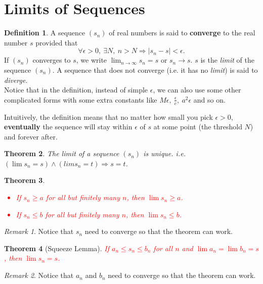 \documentclass[12pt, lettersize]{book}
\theoremstyle{plain}
\newtheorem{thm}{Theorem}[section]
\theoremstyle{definition}
\newtheorem{dfn}[thm]{Definition}
\theoremstyle{remark}
\newtheorem*{rem}{Remark}
\begin{document}
	\section{Limits of Sequences}		
	\begin{dfn}\label{def:limit}
		A sequence $(s_n)$ of real numbers is said to \textbf{converge} to the real number \emph{$s$} provided that
		\begin{displaymath}
			\forall \epsilon > 0,\ \exists N,\ n > N \Rightarrow |s_n-s| < \epsilon.
		\end{displaymath}
		If $(s_n)$ converges to $s$, we write $\lim_{n\rightarrow \infty}s_n=s$ or $s_n\rightarrow s$. $s$ is the \emph{limit} of the sequence $(s_n)$.
		A sequence that does not converge (i.e. it has no \emph{limit}) is said to \emph{diverge}.\\
		Notice that in the definition, instead of simple $\epsilon$, we can also use some other complicated forms with some extra constants like $M\epsilon,\ \frac{\epsilon}{c},\ a^2\epsilon$ and so on.
	\end{dfn}
	
	Intuitively, the definition means that no matter how small you pick $\epsilon>0$, \textbf{eventually} the sequence will stay within $\epsilon$ of $s$ at some point (the threshold $N$) and forever after.
	
	\begin{thm}
		The limit of a sequence $(s_n)$ is unique. i.e. $(\lim s_n=s) \land (lim s_n=t) \Rightarrow s=t$.
	\end{thm}
	
	\begin{thm}
		\textcolor{red}{
			\begin{itemize}
				\item If $s_n\geq a$ for all but finitely many $n$, then $\lim s_n\geq a$.
				\item If $s_n\leq b$ for all but finitely many $n$, then $\lim s_n\leq b$.
		\end{itemize}}
	\end{thm}
	\begin{rem}
		Notice that $s_n$ need to converge so that the theorem can work.
	\end{rem}
	
	\begin{thm}[Squeeze Lemma]\label{lem: squeeze}
		\textcolor{red}{If $a_n\leq s_n\leq b_n$ for all $n$ and $\lim a_n=\lim b_n=s$, then $\lim s_n=s$.}
	\end{thm}
	\begin{rem}
		Notice that $a_n$ and $b_n$ need to converge so that the theorem can work.
	\end{rem}
	
\end{document}
